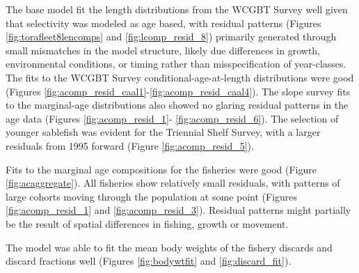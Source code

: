 \documentclass[11pt,
  english,
  a4paper,
]{article}
\begin{document}
\leavevmode\tagmcend\tagstructend\par


The base model fit the length distributions from the WCGBT Survey well given that selectivity was modeled as age based, with residual patterns (Figures \ref{fig:torafleet8lencomps} and \ref{fig:lcomp_resid_8}) primarily generated through small mismatches in the model structure, likely due differences in growth, environmental conditions, or timing rather than misspecification of year-classes. The fits to the WCGBT Survey conditional-age-at-length distributions were good (Figures \ref{fig:acomp_resid_caal1}-\ref{fig:acomp_resid_caal4}). The slope survey fits to the marginal-age distributions also showed no glaring residual patterns in the age data (Figures \ref{fig:acomp_resid_1}- \ref{fig:acomp_resid_6}). The selection of younger sablefish was evident for the Triennial Shelf Survey, with a larger residuals from 1995 forward (Figure \ref{fig:acomp_resid_5}).

\leavevmode\tagmcend\tagstructend\par

Fits to the marginal age compositions for the fisheries were good (Figure \ref{fig:acaggregate}). All fisheries show relatively small residuals, with patterns of large cohorts moving through the population at some point (Figures \ref{fig:acomp_resid_1} and \ref{fig:acomp_resid_3}). Residual patterns might partially be the result of spatial differences in fishing, growth or movement.

The model was able to fit the mean body weights of the fishery discards and discard fractions well (Figures \ref{fig:bodywtfit} and \ref{fig:discard_fit}).

\leavevmode\tagmcend\tagstructend\par

\end{document}
